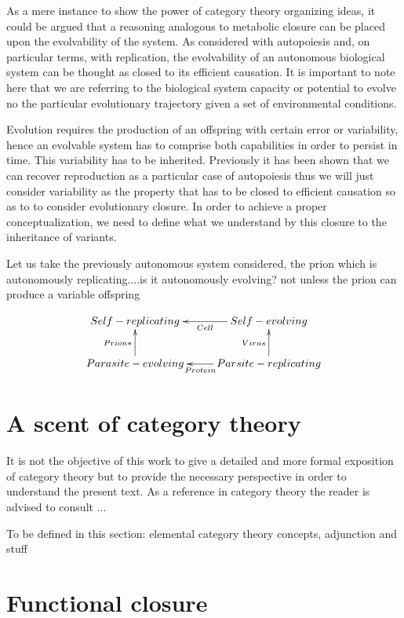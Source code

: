 \documentclass[aps,twocolumn]{revtex4-1}
\begin{document}
As a mere instance to show the power of category theory organizing ideas, it could be argued that a reasoning analogous to metabolic closure can be placed upon the evolvability of the system. As considered with autopoiesis and, on particular terms, with replication, the evolvability of an autonomous biological system can be thought as closed to its efficient causation. It is important to note here that we are referring to the biological system capacity or potential to evolve no the particular evolutionary trajectory given a set of environmental conditions. 

Evolution requires the production of an offspring with certain error or variability, hence an evolvable system has to comprise both capabilities in order to persist in time.  This variability has to be inherited. Previously it has been shown that we can recover reproduction as a particular case of autopoiesis thus we will just consider variability as the property that has to be closed to efficient causation so as to to consider evolutionary closure. In order to achieve a proper conceptualization, we need to define what we understand by this closure to the inheritance of variants. 


Let us take the previously autonomous system considered, the prion which is autonomously replicating....is it autonomously evolving? not unless the prion can produce a variable offspring 

$$ \xymatrix{
			 Self-replicating & Self-evolving \ar[l]^-{Cell}\\
			 Parasite-evolving \ar[u]^-{Prion*} & Parsite-replicating \ar[l]^-{Protein}\ar[u]^-{Virus} \\} $$
			  
\section{A scent of category theory}

It is not the objective of this work to give a detailed and more formal exposition of category theory but to provide the necessary perspective in order to understand the present text. As a reference in category theory the reader is advised to consult ...

To be defined in this section: elemental category theory concepts, adjunction and stuff

\section{Functional closure}
\end{document}
